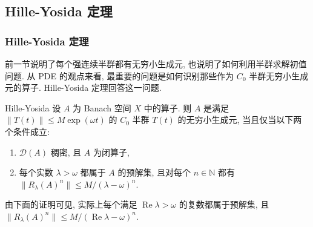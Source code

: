 \subsection{Hille-Yosida 定理}\label{sec:hille-yosida-theorem}

\subsubsection{Hille-Yosida 定理}\label{subsec:hille-yosida-theorem}

前一节说明了每个强连续半群都有无穷小生成元, 也说明了如何利用半群求解初值问题. 从 PDE 的观点来看, 最重要的问题是如何识别那些作为 $C_0$ 半群无穷小生成元的算子. Hille-Yosida 定理回答这一问题.

\begin{Theorem}{Hille-Yosida}
\label{thm:hille-yosida-generation}
设 $A$ 为 Banach 空间 $X$ 中的算子. 则 $A$ 是满足 $\|T(t)\|\leq M\exp(\omega t)$ 的 $C_0$ 半群 $T(t)$ 的无穷小生成元, 当且仅当以下两个条件成立:\begin{enumerate}\item\label{hyp:hille-yosida-dense-closed} $\mathcal{D}(A)$ 稠密, 且 $A$ 为闭算子,\item\label{hyp:hille-yosida-resolvent-powers} 每个实数 $\lambda>\omega$ 都属于 $A$ 的预解集, 且对每个 $n\in\mathbb{N}$ 都有 $\|R_\lambda(A)^n\|\leq M/(\lambda-\omega)^n$.\end{enumerate}
\end{Theorem}

由下面的证明可见, 实际上每个满足 $\operatorname{Re}\lambda>\omega$ 的复数都属于预解集, 且 $\|R_\lambda(A)^n\|\leq M/(\operatorname{Re}\lambda-\omega)^n$.

